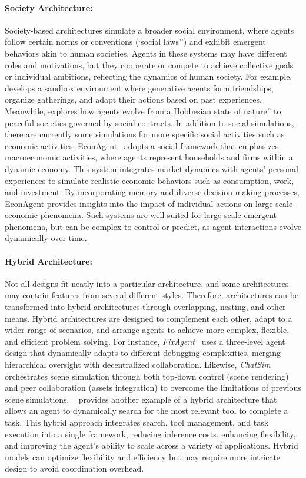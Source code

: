 \paragraph{Society Architecture:}Society-based architectures simulate a broader social environment, where agents follow certain norms or conventions (`social laws'') and exhibit emergent behaviors akin to human societies. Agents in these systems may have different roles and motivations, but they cooperate or compete to achieve collective goals or individual ambitions, reflecting the dynamics of human society. For example, \cite{stanf_villege} develops a sandbox environment where generative agents form friendships, organize gatherings, and adapt their actions based on past experiences. Meanwhile, \cite{sct_society} explores how agents evolve from a Hobbesian state of nature'' to peaceful societies governed by social contracts. In addition to social simulations, there are currently some simulations for more specific social activities such as economic activities. EconAgent~\cite{econagent} adopts a social framework that emphasizes macroeconomic activities, where agents represent households and firms within a dynamic economy. This system integrates market dynamics with agents' personal experiences to simulate realistic economic behaviors such as consumption, work, and investment. By incorporating memory and diverse decision-making processes, EconAgent provides insights into the impact of individual actions on large-scale economic phenomena. Such systems are well-suited for large-scale emergent phenomena, but can be complex to control or predict, as agent interactions evolve dynamically over time.

\paragraph{Hybrid Architecture:}Not all designs fit neatly into a particular architecture, and some architectures may contain features from several different styles. Therefore, architectures can be transformed into hybrid architectures through overlapping, nesting, and other means. Hybrid architectures are designed to complement each other, adapt to a wider range of scenarios, and arrange agents to achieve more complex, flexible, and efficient problem solving. For instance, \textit{FixAgent}~\cite{fixagent_mas_for_debug} uses a three-level agent design that dynamically adapts to different debugging complexities, merging hierarchical oversight with decentralized collaboration. Likewise, \textit{ChatSim}~\cite{chatsim_mas_make_scene} orchestrates scene simulation through both top-down control (scene rendering) and peer collaboration (assets integration) to overcome the limitations of previous scene simulations. ~\cite{mas_use_tool} provides another example of a hybrid architecture that allows an agent to dynamically search for the most relevant tool to complete a task. This hybrid approach integrates search, tool management, and task execution into a single framework, reducing inference costs, enhancing flexibility, and improving the agent's ability to scale across a variety of applications. Hybrid models can optimize flexibility and efficiency but may require more intricate design to avoid coordination overhead.

